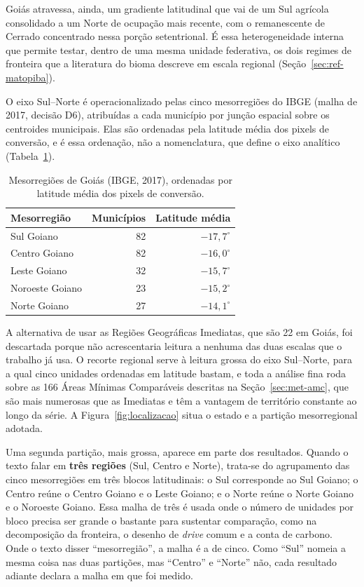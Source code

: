 Goiás atravessa, ainda, um gradiente latitudinal que vai de um Sul agrícola
consolidado a um Norte de ocupação mais recente, com o remanescente de
Cerrado concentrado nessa porção setentrional. É essa heterogeneidade interna
que permite testar, dentro de uma mesma unidade federativa, os dois regimes
de fronteira que a literatura do bioma descreve em escala regional
(Seção~\ref{sec:ref-matopiba}).

O eixo Sul--Norte é operacionalizado pelas cinco mesorregiões do IBGE (malha
de 2017, decisão D6), atribuídas a cada município por junção espacial sobre
os centroides municipais. Elas são ordenadas pela latitude média dos pixels
de conversão, e é essa ordenação, não a nomenclatura, que define o eixo
analítico (Tabela~\ref{tab:mesorregioes}).

\begin{table}[htb]
\centering
\caption[Mesorregiões de Goiás, ordenadas por latitude]{Mesorregiões de Goiás (IBGE, 2017), ordenadas por latitude média
dos pixels de conversão.}
\label{tab:mesorregioes}
\small
\begin{tabular}{lrr}
\toprule
\textbf{Mesorregião} & \textbf{Municípios} & \textbf{Latitude média} \\
\midrule
Sul Goiano      & 82 & $-17{,}7^\circ$ \\
Centro Goiano   & 82 & $-16{,}0^\circ$ \\
Leste Goiano    & 32 & $-15{,}7^\circ$ \\
Noroeste Goiano & 23 & $-15{,}2^\circ$ \\
Norte Goiano    & 27 & $-14{,}1^\circ$ \\
\bottomrule
\end{tabular}
\end{table}

A alternativa de usar as Regiões Geográficas Imediatas, que são 22 em Goiás,
foi descartada porque não acrescentaria leitura a nenhuma das duas escalas que
o trabalho já usa. O recorte regional serve à leitura grossa do eixo
Sul--Norte, para a qual cinco unidades ordenadas em latitude bastam, e toda a
análise fina roda sobre as 166 Áreas Mínimas Comparáveis descritas na
Seção~\ref{sec:met-amc}, que são mais numerosas que as Imediatas e têm a
vantagem de território constante ao longo da série. A
Figura~\ref{fig:localizacao} situa o estado e a partição mesorregional
adotada.

Uma segunda partição, mais grossa, aparece em parte dos resultados. Quando o
texto falar em \textbf{três regiões} (Sul, Centro e Norte), trata-se do
agrupamento das cinco mesorregiões em três blocos latitudinais: o Sul
corresponde ao Sul Goiano; o Centro reúne o Centro Goiano e o Leste Goiano; e
o Norte reúne o Norte Goiano e o Noroeste Goiano. Essa malha de três é usada
onde o número de unidades por bloco precisa ser grande o bastante para
sustentar comparação, como na decomposição da fronteira, o desenho de \emph{drive}
comum e a conta de carbono. Onde o texto disser ``mesorregião'', a malha é a
de cinco. Como ``Sul'' nomeia a mesma coisa nas duas partições, mas ``Centro''
e ``Norte'' não, cada resultado adiante declara a malha em que foi medido.

